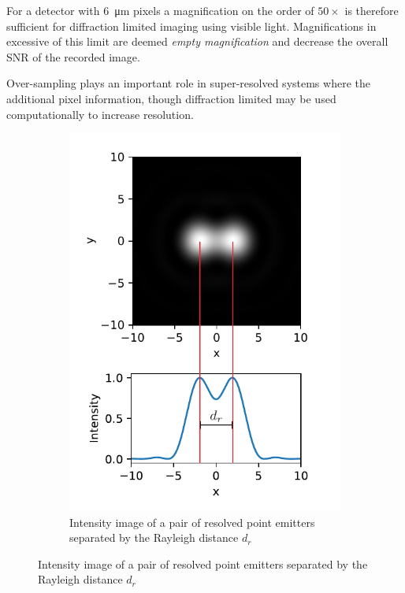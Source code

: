 For a detector with \SI{6}{\micro\meter} pixels a magnification on the order of $50\times$ is therefore sufficient for diffraction limited imaging using visible light.
Magnifications in excessive of this limit are deemed \emph{empty magnification} and decrease the overall SNR of the recorded image.

Over-sampling plays an important role in super-resolved systems where the additional pixel information, though diffraction limited may be used computationally to increase resolution.

\begin{figure}
    \centering
    \begin{subfigure}[b]{\textwidth}
        \centering
        \includegraphics{./sampling/sample_master}
        \caption{Intensity image of a pair of resolved point emitters separated by the Rayleigh distance $d_{r}$}
        \label{fig:sample_master}
    \end{subfigure}
\end{figure}~
